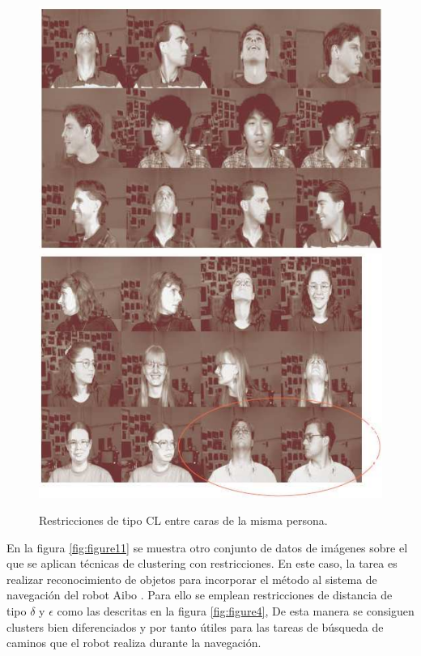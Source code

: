 \begin{figure}[bth]
	\myfloatalign
	{\includegraphics[width=.35\linewidth]{imagenes/c3/AnalisisImagenes/CarasDifOr1}} \quad
	{\includegraphics[width=.35\linewidth]{imagenes/c3/AnalisisImagenes/CarasDifOr2}}
	\caption[Restricciones de tipo \ac{CL} entre caras de la misma persona.]{Restricciones de tipo \ac{CL} entre caras de la misma persona.  \cite{Survey:2007}}\label{fig:figure10}
\end{figure}

En la figura \ref{fig:figure11} se muestra otro conjunto de datos de imágenes sobre el que se aplican técnicas de clustering con restricciones. En este caso, la tarea es realizar reconocimiento de objetos para incorporar el método al sistema de navegación del robot Aibo \cite{DavidsonRavi:2005a}. Para ello se emplean restricciones de distancia de tipo $\delta$ y $\epsilon$ como las descritas en la figura \ref{fig:figure4}, De esta manera se consiguen clusters bien diferenciados y por tanto útiles para las tareas de búsqueda de caminos que el robot realiza durante la navegación.


